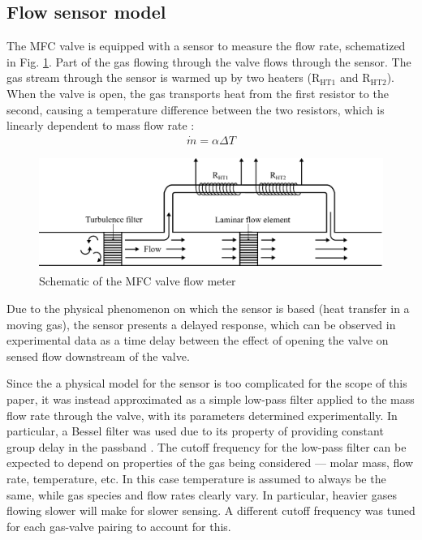\documentclass[letterpaper, 10pt, conference]{ieeeconf}
\begin{document}
\subsection{Flow sensor model}
The MFC valve is equipped with a sensor to measure the flow rate, schematized in Fig. \ref{fig:sensor}. Part of the gas flowing through the valve flows through the sensor. The gas stream through the sensor is warmed up by two heaters ($\text{R}_{\text{HT1}}$ and $\text{R}_{\text{HT2}}$). When the valve is open, the gas transports heat from the first resistor to the second, causing a temperature difference between the two resistors, which is linearly dependent to mass flow rate \cite{sensor}:
\begin{align}
    \dot{m} = \alpha \Delta T
\end{align}
\begin{figure}[!htb]
    \centering
    \includegraphics[width = 0.8\columnwidth]{flow_sensor}
    \caption{Schematic of the MFC valve flow meter}
    \label{fig:sensor}
\end{figure}
Due to the physical phenomenon on which the sensor is based (heat transfer in a moving gas), the sensor presents a delayed response, which can be observed in experimental data as a time delay between the effect of opening the valve on sensed flow downstream of the valve. %

Since the a physical model for the sensor is too complicated for the scope of this paper, it was instead approximated as a simple low-pass filter applied to the mass flow rate through the valve, with its parameters determined experimentally. In particular, a Bessel filter was used due to its property of providing constant group delay in the passband \cite{filtering}.
The cutoff frequency for the low-pass filter can be expected to depend on properties of the gas being considered --- molar mass, flow rate, temperature, etc. In this case temperature is assumed to always be the same, while gas species and flow rates clearly vary. In particular, heavier gases flowing slower will make for slower sensing. A different cutoff frequency was tuned for each gas-valve pairing to account for this.
\end{document}
